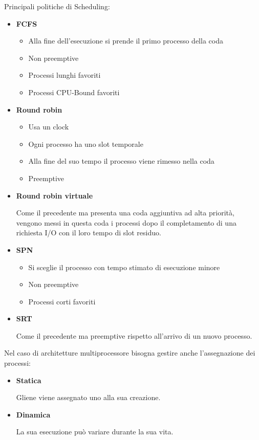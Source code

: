 \documentclass{article}
\begin{document}
\noindent Principali politiche di Scheduling:
\begin{itemize}
    \item \textbf{FCFS}
        \begin{itemize}
            \item Alla fine dell'esecuzione si prende il primo processo della coda
            \item Non preemptive
            \item Processi lunghi favoriti
            \item Processi CPU-Bound favoriti
        \end{itemize}

    \item \textbf{Round robin}
            \begin{itemize}
            \item Usa un clock
            \item Ogni processo ha uno slot temporale
            \item Alla fine del suo tempo il processo viene rimesso nella coda
            \item Preemptive
        \end{itemize}

    \item \textbf{Round robin virtuale}

            Come il precedente ma presenta una coda aggiuntiva ad alta priorità, vengono messi in questa coda i processi dopo il completamento di una richiesta I/O con il loro tempo di slot residuo.

    \item \textbf{SPN}
            \begin{itemize}
            \item Si sceglie il processo con tempo stimato di esecuzione minore
            \item Non preemptive
            \item Processi corti favoriti
        \end{itemize}

    \item \textbf{SRT}

        Come il precedente ma preemptive rispetto all'arrivo di un nuovo processo.\newline
        
\end{itemize}

\noindent Nel caso di architetture multiprocessore bisogna gestire anche l'assegnazione dei processi:
\begin{itemize}
    \item \textbf{Statica}

        Gliene viene assegnato uno alla sua creazione.

    \item \textbf{Dinamica}

        La sua esecuzione può variare durante la sua vita.\newline
    
\end{itemize}
\end{document}
